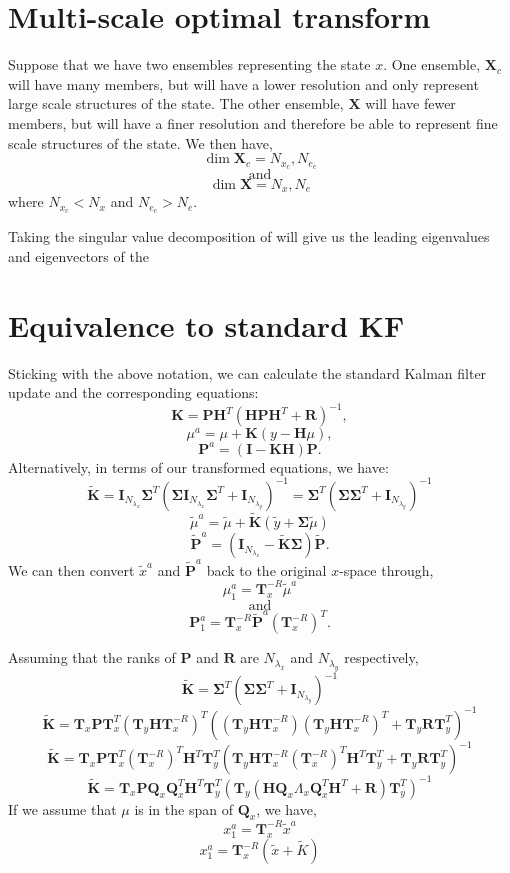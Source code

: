 \documentclass[11pt]{article} %
\newcommand{\mat}{\mathbf}
\begin{document}
\section{Multi-scale optimal transform}

Suppose that we have two ensembles representing the state $x$.
One ensemble, $\mat{X}_c$ will have many members, but will have a lower
resolution and only represent large scale structures of the state.
The other ensemble, $\mat{X}$ will have fewer members, but will
have a finer resolution and therefore be able to represent fine scale
structures of the state.
We then have,
\[
  \dim \mat{X}_c = N_{x_c}, N_{e_c}
\]
\[\text{and}\]
\[
  \dim \mat{X} = N_x, N_e
\]
where $N_{x_c} < N_x$ and $N_{e_c} > N_e$.

Taking the singular value decomposition of will give us the
leading eigenvalues and eigenvectors of the

\section{Equivalence to standard KF}

Sticking with the above notation, we can calculate the standard Kalman
filter update and the corresponding equations:
\[
  \mat{K} = \mat{P}\mat{H}^T (\mat{H} \mat{P} \mat{H}^T + \mat{R})^{-1},
\]
\[
  \mu^a = \mu + \mat{K} (y - \mat{H} \mu),
\]
\[
  \mat{P}^a = (\mat{I} - \mat{K} \mat{H}) \mat{P}.
\]
Alternatively, in terms of our transformed equations, we have:
\[
  \tilde{\mat{K}} = \mat{I}_{N_{\lambda_x}} \mat{\Sigma}^T ( \mat{\Sigma} \mat{I}_{N_{\lambda_x}}
  \mat{\Sigma}^T + \mat{I}_{N_{\lambda_y}})^{-1} = \mat{\Sigma}^T (\mat{\Sigma}
  \mat{\Sigma}^T + \mat{I}_{N_{\lambda_y}})^{-1}
\]
\[
  \tilde{\mu}^a = \tilde{\mu} + \tilde{\mat{K}}(\tilde{y} + \mat{\Sigma} \tilde{\mu})
\]
\[
  \tilde{\mat{P}}^a = (\mat{I}_{N_{\lambda_x}} - \tilde{\mat{K}} \mat{\Sigma}) \tilde{\mat{P}}.
\]
We can then convert $\tilde{x}^a$ and $\tilde{\mat{P}}^a$ back to the
original $x$-space through,
\[
  \mu^a_1 = \mat{T}_x^{-R} \tilde{\mu}^a
\]
\[
  \text{ and }
\]
\[
  \mat{P}^a_1 = \mat{T}_x^{-R} \tilde{\mat{P}}^a \left(\mat{T}_x^{-R}\right)^T.
\]

Assuming that the ranks of $\mat{P}$ and $\mat{R}$ are $N_{\lambda_x}$
and $N_{\lambda_y}$ respectively,
\[
  \tilde{\mat{K}} = \mat{\Sigma}^T (\mat{\Sigma} \mat{\Sigma}^T +
  \mat{I}_{N_{\lambda_y}})^{-1}
\]
\[
  \tilde{\mat{K}} = \mat{T}_x \mat{P} \mat{T}_x^T (\mat{T}_y \mat{H}
  \mat{T}_x^{-R})^T \left((\mat{T}_y \mat{H} \mat{T}_x^{-R})(\mat{T}_y
  \mat{H} \mat{T}_x^{-R})^T + \mat{T}_y \mat{R} \mat{T}_y^T \right)^{-1}
\]
\[
  \tilde{\mat{K}} = \mat{T}_x \mat{P} \mat{T}_x^T \left( \mat{T}_x^{-R}
  \right)^T \mat{H}^T \mat{T}_y^T
  \left( \mat{T}_y \mat{H} \mat{T}_x^{-R} \left( \mat{T}_x^{-R}
    \right)^T \mat{H}^T \mat{T}_y^T + \mat{T}_y \mat{R} \mat{T}_y^T \right)^{-1}
\]
\[
  \tilde{\mat{K}} = \mat{T}_x \mat{P} \mat{Q}_x \mat{Q}_x^T \mat{H}^T \mat{T}_y^T
  \left( \mat{T}_y \left( \mat{H} \mat{Q}_x \Lambda_x \mat{Q}_x^T
      \mat{H}^T + \mat{R}\right) \mat{T}_y^T \right)^{-1}
\]
If we assume that $\mu$ is in the span of $\mat{Q}_x$, we have,
\[
   x^a_1 = \mat{T}_x^{-R} \tilde{x}^a
\]
\[
   x^a_1 = \mat{T}_x^{-R} \left( \tilde{x} + \tilde{K} \right)
\]
\end{document}
